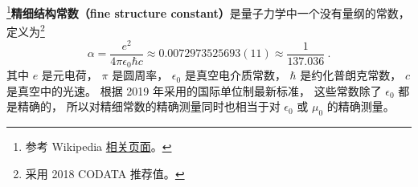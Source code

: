 

\footnote{参考 Wikipedia \href{https://en.wikipedia.org/wiki/Fine-structure_constant}{相关页面}。}\textbf{精细结构常数（fine structure constant）}是量子力学中一个没有量纲的常数， 定义为\footnote{采用 2018 CODATA 推荐值。}
\begin{equation}\label{eq_FinStr_1}
\alpha = \frac{e^2}{4\pi\epsilon_0\hbar c} \approx 0.0072973525693(11) \approx \frac{1}{137.036}~.
\end{equation}
其中 $e$ 是元电荷， $\pi$ 是圆周率， $\epsilon_0$ 是真空电介质常数， $\hbar$ 是约化普朗克常数， $c$ 是真空中的光速。 %
根据 2019 年采用的国际单位制最新标准， 这些常数除了 $\epsilon_0$ 都是精确的， 所以对精细常数的精确测量同时也相当于对 $\epsilon_0$ 或 $\mu_0$ 的精确测量。
